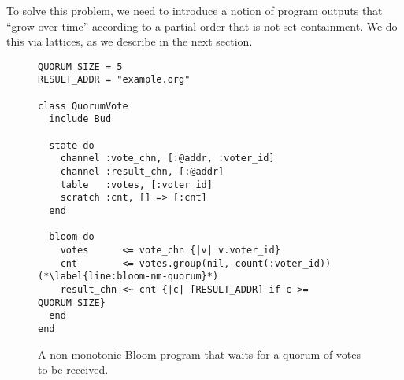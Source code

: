 To solve this problem, we need to introduce a notion of program outputs that
``grow over time'' according to a partial order that is not set containment. We
do this via lattices, as we describe in the next section.

\begin{figure}[t]
\begin{scriptsize}
\begin{lstlisting}
QUORUM_SIZE = 5
RESULT_ADDR = "example.org"

class QuorumVote
  include Bud

  state do
    channel :vote_chn, [:@addr, :voter_id]
    channel :result_chn, [:@addr]
    table   :votes, [:voter_id]
    scratch :cnt, [] => [:cnt]
  end

  bloom do
    votes      <= vote_chn {|v| v.voter_id}
    cnt        <= votes.group(nil, count(:voter_id)) (*\label{line:bloom-nm-quorum}*)
    result_chn <~ cnt {|c| [RESULT_ADDR] if c >= QUORUM_SIZE}
  end
end
\end{lstlisting}
\end{scriptsize}
\caption{A non-monotonic Bloom program that waits for a quorum of votes to be received.}
\label{fig:bloom-nm-quorum}
\end{figure}
